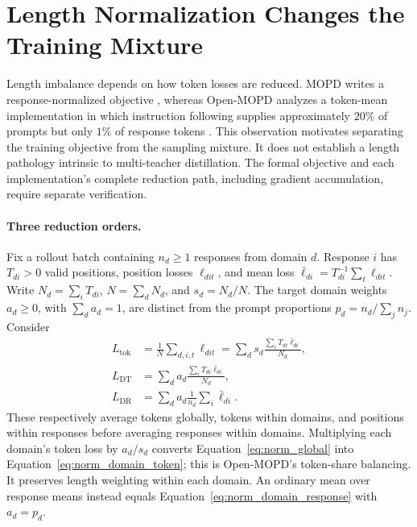 \section{Length Normalization Changes the Training Mixture}
\label{sec:normalization}

Length imbalance depends on how token losses are reduced. MOPD writes a
response-normalized objective
\citep{ma2026mopdmultiteacheronpolicydistillation}, whereas Open-MOPD
analyzes a token-mean implementation in which instruction following supplies
approximately $20\%$ of prompts but only $1\%$ of response tokens
\citep{gao2026openmopddiagnosingfixingcapability}. This observation motivates
separating the training objective from the sampling mixture. It does not
establish a length pathology intrinsic to multi-teacher distillation.
The formal objective and each implementation's complete reduction path,
including gradient accumulation, require separate verification.

\paragraph{Three reduction orders.}
Fix a rollout batch containing $n_d\geq1$ responses from domain $d$.
Response $i$ has $T_{di}>0$ valid positions, position losses $\ell_{dit}$,
and mean loss $\bar\ell_{di}=T_{di}^{-1}\sum_t\ell_{dit}$.
Write $N_d=\sum_iT_{di}$, $N=\sum_dN_d$, and $s_d=N_d/N$.
The target domain weights $a_d\geq0$, with $\sum_da_d=1$, are distinct
from the prompt proportions $p_d=n_d/\sum_jn_j$. Consider
\begin{align}
 L_{\mathrm{tok}}
   &=\frac1N\sum_{d,i,t}\ell_{dit}
     =\sum_ds_d\frac{\sum_iT_{di}\bar\ell_{di}}{N_d},
     \label{eq:norm_global}\\
 L_{\mathrm{DT}}
   &=\sum_da_d\frac{\sum_iT_{di}\bar\ell_{di}}{N_d},
     \label{eq:norm_domain_token}\\
 L_{\mathrm{DR}}
   &=\sum_da_d\frac1{n_d}\sum_i\bar\ell_{di}.
     \label{eq:norm_domain_response}
\end{align}
These respectively average tokens globally, tokens within domains, and
positions within responses before averaging responses within domains.
Multiplying each domain's token loss by $a_d/s_d$ converts
Equation~\ref{eq:norm_global} into Equation~\ref{eq:norm_domain_token};
this is Open-MOPD's token-share balancing. It preserves length weighting
within each domain. An ordinary mean over response means instead equals
Equation~\ref{eq:norm_domain_response} with $a_d=p_d$.

